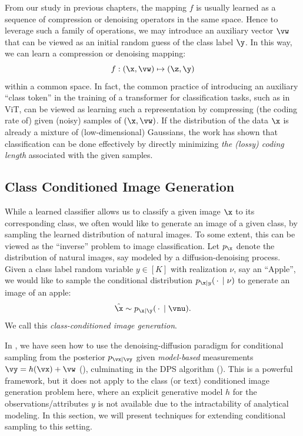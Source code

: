 \documentclass[../../book-main.tex]{subfiles}
\begin{document}
From our study in previous chapters, the mapping $f$ is usually learned as a sequence of compression or denoising operators in the same space. Hence to leverage such a family of operations, we may introduce an auxiliary vector $\vw$ that can be viewed as an initial random guess of the class label $\y$. In this way, we can learn a compression or denoising mapping:
\begin{equation}\label{eq:classifier-with-class-token}
    f: (\x, \vw) \mapsto (\z, \y)
\end{equation}
within a common space. In fact, the common practice of introducing an auxiliary ``class token'' in the training of a transformer for classification tasks, such as in ViT, can be viewed as learning such a representation by compressing (the coding rate of) given (noisy) samples of $(\x, \vw)$. If the distribution of the data $\x$ is already a mixture of (low-dimensional) Gaussians, the work \cite{wright2008classification} has shown that classification can be done effectively by directly minimizing {\em the (lossy) coding length} associated with the given samples.


\subsection{Class Conditioned Image Generation}\label{sub:cfg} 
While a learned classifier allows us to classify a given image $\x$ to its
corresponding class, we often would like to generate an image of a given class, by
sampling the learned distribution of natural images. To some extent, this can be
viewed as the ``inverse'' problem to image classification. Let $p_{\x}$ denote
the distribution of natural images, say modeled by a diffusion-denoising
process. Given a class label random variable $y \in [K]$ with realization $\nu$, say
an ``Apple'', we would like to sample the conditional distribution $p_{\x \mid
y}(\,\cdot\, \mid \nu)$ to generate an image of an apple:
\begin{equation}
  \hat{\x} \sim p_{\x\mid \y}(\,\cdot\, \mid \vnu).
\end{equation}
We call this {\em class-conditioned image generation}.

In , we have seen how to use the denoising-diffusion paradigm for
conditional sampling from the posterior $p_{\vx \mid \vy}$ given
\textit{model-based} measurements $\vy = h(\vx) + \vw$
(), culminating in the
DPS algorithm (). This is a powerful
framework, but it does not apply to the class (or text) conditioned image
generation problem here, where an explicit generative model $h$ for the
observations/attributes $y$ is not available due to the
intractability of analytical modeling. In this section, we will present techniques for extending
conditional sampling to this setting.
\end{document}
